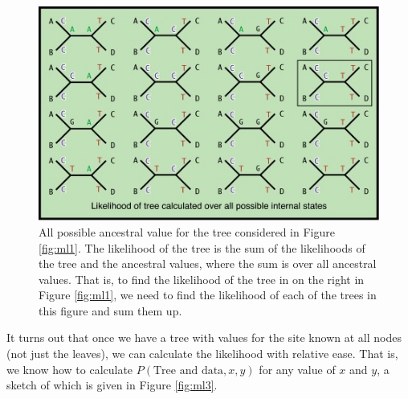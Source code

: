 \documentclass[11pt]{article}
\begin{document}
 \begin{figure}[hbtp]
\includegraphics[width=12cm]{figures/ml2}
\caption{ All possible ancestral value for the tree considered in Figure \ref{fig:ml1}. The likelihood of the tree is the sum of the likelihoods of the tree and the ancestral values, where the sum is over all ancestral values.  That is, to find the likelihood of the tree in on the right in Figure \ref{fig:ml1}, we need to find the likelihood of each of the trees in this figure and sum them up.  }
\label{fig:ml2}
\end{figure}



It turns out that once we have a tree with values for the site known at all nodes (not just the leaves), we can calculate the likelihood with relative ease.  That is, we know how to calculate $P( \mbox{Tree and data},x,y)$ for any value of $x$ and $y$, a sketch of which is given in Figure \ref{fig:ml3}.   
\end{document}
